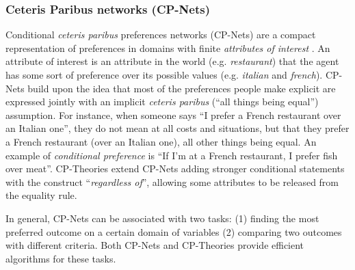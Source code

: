 \subsubsection*{Ceteris Paribus networks (CP-Nets) }
Conditional \textit{ceteris paribus}  preferences networks (CP-Nets) are a compact representation of preferences in domains with finite \textit{attributes of interest} \cite{Boutilier2004}. An attribute of interest is an attribute in the world (e.g. \textit{restaurant}) that the agent has some sort of preference over its possible values (e.g. \textit{italian} and \textit{french}). CP-Nets build upon the idea that most of the preferences people make explicit are expressed jointly with an implicit \textit{ceteris paribus} (``all things being equal'') assumption. For instance, when someone says ``I prefer a French restaurant over an Italian one'', they do not mean at all costs and situations, but that they prefer a French restaurant (over an Italian one), all other things being equal. An example of \textit{conditional preference} is ``If I'm at a French restaurant, I prefer fish over meat''.
CP-Theories \cite{Wilson2004} extend CP-Nets adding stronger conditional statements with the construct ``\textit{regardless of}'', allowing some attributes to be released from the equality rule. 

In general, CP-Nets can be associated with two tasks: (1) finding the most preferred outcome on a certain domain of variables (2) comparing two outcomes with different criteria. Both CP-Nets and CP-Theories provide efficient algorithms for these tasks.


